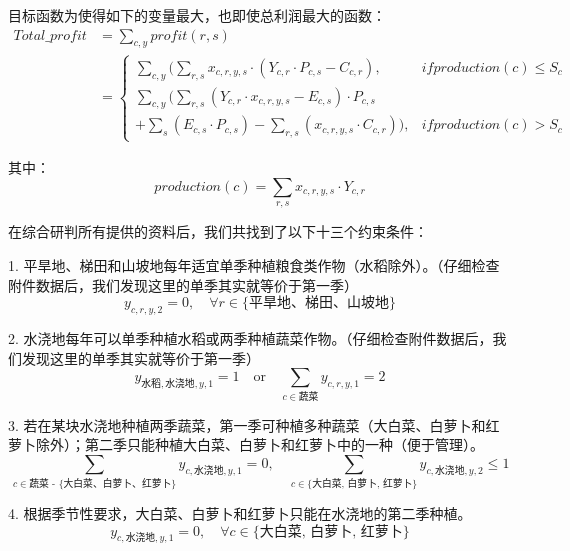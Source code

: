 \documentclass[withoutpreface]{cumcmthesis}
\begin{document}
\newpage
目标函数为使得如下的变量最大，也即使总利润最大的函数：\\
\begin{align}
    Total\_profit &= \sum_{c, y} profit(r, s)  \\ 
    &=\begin{cases} 
        \sum_{c, y}(\sum_{r, s} x_{c, r, y, s} \cdot(Y_{c, r} \cdot P_{c, s} - C_{c, r}), 
            & if production(c) \leq S_c \\
        \sum_{c, y}(\sum_{r, s}(Y_{c, r} \cdot x_{c, r, y, s} - E_{c, s}) \cdot P_{c, s} \\
                    + \sum_{s}(E_{c, s} \cdot P_{c, s}) - \sum_{r, s}(x_{c, r, y, s} \cdot C_{c, r})), 
            & if production(c) > S_c
    \end{cases}
\end{align}

其中：
\begin{equation}
    production(c) = \sum_{r, s} x_{c,r,y,s} \cdot Y_{c,r}
\end{equation}

在综合研判所有提供的资料后，我们共找到了以下十三个约束条件：

1. 平旱地、梯田和山坡地每年适宜单季种植粮食类作物（水稻除外）。（仔细检查附件数据后，我们发现这里的单季其实就等价于第一季）
   \begin{equation}
    y_{c,r,y,2} = 0, \quad \forall r \in \{\text{平旱地、梯田、山坡地}\}  %
   \end{equation}

2. 水浇地每年可以单季种植水稻或两季种植蔬菜作物。（仔细检查附件数据后，我们发现这里的单季其实就等价于第一季）
   \begin{equation}
    y_{\text{水稻},\text{水浇地},y,1} = 1 \quad \text{or} \quad  %
    \sum_{c \in \text{蔬菜}} y_{c,r,y,1} = 2 
   \end{equation}

3. 若在某块水浇地种植两季蔬菜，第一季可种植多种蔬菜（大白菜、白萝卜和红萝卜除外）；第二季只能种植大白菜、白萝卜和红萝卜中的一种（便于管理）。
   \begin{equation}
   \sum_{c \in \text{蔬菜 - \{大白菜、白萝卜、红萝卜\}}} y_{c,\text{水浇地},y,1} = 0, \quad \sum_{c \in \{\text{大白菜, 白萝卜, 红萝卜}\}} y_{c,\text{水浇地},y,2} \leq 1
   \end{equation}

4. 根据季节性要求，大白菜、白萝卜和红萝卜只能在水浇地的第二季种植。
   \begin{equation}
   y_{c,\text{水浇地},y,1} = 0, \quad \forall c \in \{\text{大白菜, 白萝卜, 红萝卜}\}
   \end{equation}
\end{document}
